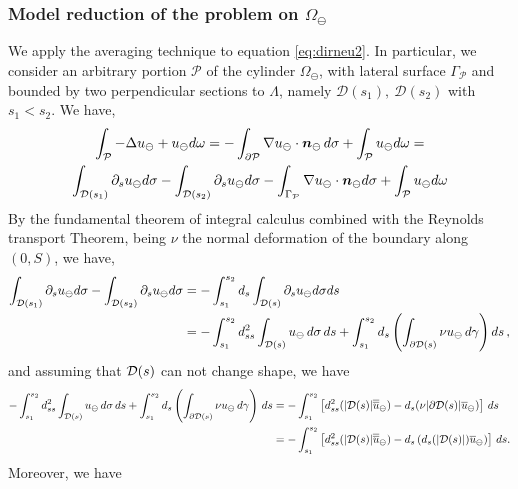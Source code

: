 \documentclass[r]{siamart171218}
\begin{document}
\subsubsection*{Model reduction of the problem on $\Omega_{\ominus}$}

We apply the averaging technique to equation \eqref{eq:dirneu2}. In particular, we consider an arbitrary portion $\mathcal{P}$ of the cylinder $\Omega_\ominus$, with lateral surface $\Gamma _{\mathcal{P}}$ and bounded by two perpendicular sections to $\Lambda$, namely $\mathcal{D}(s_1), \ \mathcal{D}(s_2)$ with $s_1<s_2$. We have,
\begin{multline*}
\int_{\mathcal{P}} -\Delta u_{\ominus} + u_{\ominus} d\omega =
-\int_{\partial \mathcal{P}} \nabla u_{\ominus} \cdot \boldsymbol n_{\ominus} \, d\sigma  + \int_{\mathcal{P}}u_{\ominus} d\omega=
\\
 \int_{\mathcal{D}(s_1)} \partial_s u_{\ominus} d\sigma -  \int_{\mathcal{D}(s_2)} \partial_s u_{\ominus} d\sigma -  \int_{\Gamma_{\mathcal{P}}} \nabla u_{\ominus} \cdot \boldsymbol n_{\ominus} d\sigma +\int_{\mathcal{P}}u_{\ominus} d\omega
\end{multline*}
By the fundamental theorem of integral calculus combined with the Reynolds transport Theorem, 
being $\nu$ the normal deformation of the boundary along $(0,S)$, we have,
\begin{equation*}
\begin{split}
\int_{\mathcal{D}(s_1)} \partial_s u_{\ominus} d\sigma -  \int_{\mathcal{D}(s_2)} \partial_s u_{\ominus} d\sigma 
&= -\int_{s_1}^{s_2} d_s \int_{\mathcal{D}(s)}  \partial_s u_{\ominus} d\sigma ds
\\
&= -\int_{s_1}^{s_2} d_{ss}^2 \int_{\mathcal{D}(s)} u_{\ominus} \, d\sigma \, ds +  \int_{s_1}^{s_2} d_s \left( \int_{\partial\mathcal{D}(s)} \nu u_{\ominus} \, d\gamma \right) ds\,,
\end{split}
\end{equation*}
and assuming that $\mathcal{D}(s)$  can not change shape, we have
\begin{equation*}
\begin{split}
-\int_{s_1}^{s_2} d_{ss}^2 \int_{\mathcal{D}(s)} u_{\ominus} \, d\sigma \, ds + \int_{s_1}^{s_2} d_s \left( \int_{\partial\mathcal{D}(s)} \nu u_{\ominus} \, d\gamma \right)\, ds
&=-\int_{s_1}^{s_2} \left[d_{ss}^2 (|\mathcal{D}(s)|\overline{\overline{u}}_{\ominus}) -  d_s(  \nu |\partial\mathcal{D}(s)| \overline{u}_{\ominus} ) \right] \, ds
\\
&=-\int_{s_1}^{s_2} \left[d_{ss}^2 (|\mathcal{D}(s)|\overline{\overline{u}}_{\ominus}) -  d_s\left(d_s(|\mathcal{D}(s)|) \overline{u}_{\ominus} \right) \right] \, ds.
\end{split}
\end{equation*}
Moreover, we have
\end{document}
